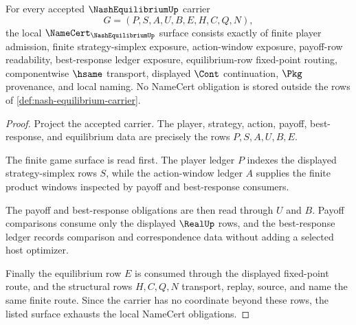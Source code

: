 \begin{theorem}
\label{thm:nash-equilibrium-namecert-obligations}
For every accepted $\NashEquilibriumUp$ carrier
$$
G=(P,S,A,U,B,E,H,C,Q,N),
$$
the local $\NameCert_{\NashEquilibriumUp}$ surface consists exactly of finite player admission, finite strategy-simplex exposure, action-window exposure, payoff-row readability, best-response ledger exposure, equilibrium-row fixed-point routing, componentwise $\hsame$ transport, displayed $\Cont$ continuation, $\Pkg$ provenance, and local naming. No NameCert obligation is stored outside the rows of \autoref{def:nash-equilibrium-carrier}.
\end{theorem}
\begin{proof}
Project the accepted carrier. The player, strategy, action, payoff, best-response, and equilibrium data are precisely the rows $P,S,A,U,B,E$.

The finite game surface is read first. The player ledger $P$ indexes the displayed strategy-simplex rows $S$, while the action-window ledger $A$ supplies the finite product windows inspected by payoff and best-response consumers.

The payoff and best-response obligations are then read through $U$ and $B$. Payoff comparisons consume only the displayed $\RealUp$ rows, and the best-response ledger records comparison and correspondence data without adding a selected host optimizer.

Finally the equilibrium row $E$ is consumed through the displayed fixed-point route, and the structural rows $H,C,Q,N$ transport, replay, source, and name the same finite route. Since the carrier has no coordinate beyond these rows, the listed surface exhausts the local NameCert obligations.
\end{proof}

